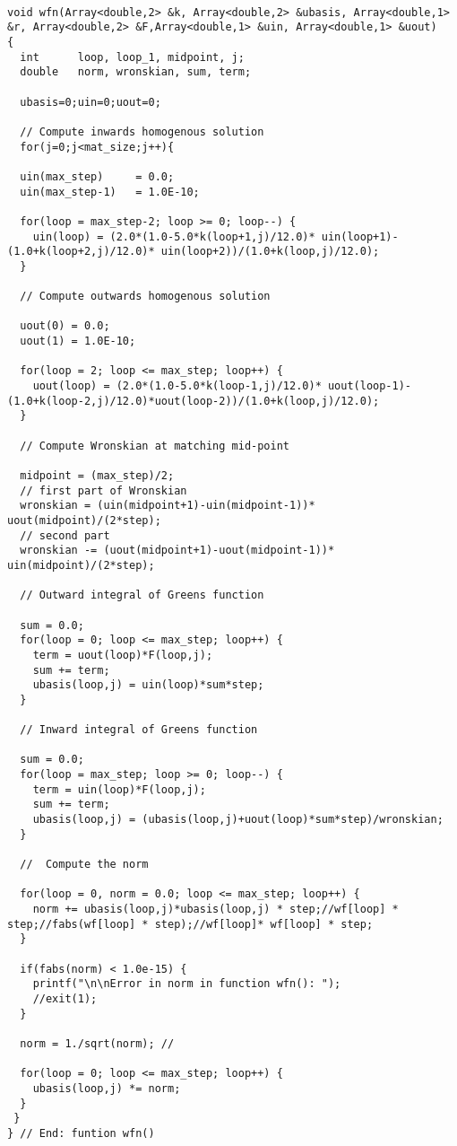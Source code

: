  \begin{lstlisting}

void wfn(Array<double,2> &k, Array<double,2> &ubasis, Array<double,1> &r, Array<double,2> &F,Array<double,1> &uin, Array<double,1> &uout)
{
  int      loop, loop_1, midpoint, j;
  double   norm, wronskian, sum, term;
  
  ubasis=0;uin=0;uout=0;
    
  // Compute inwards homogenous solution
  for(j=0;j<mat_size;j++){
  
  uin(max_step)     = 0.0;
  uin(max_step-1)   = 1.0E-10;

  for(loop = max_step-2; loop >= 0; loop--) {
    uin(loop) = (2.0*(1.0-5.0*k(loop+1,j)/12.0)* uin(loop+1)- (1.0+k(loop+2,j)/12.0)* uin(loop+2))/(1.0+k(loop,j)/12.0);
  }  

  // Compute outwards homogenous solution

  uout(0) = 0.0;
  uout(1) = 1.0E-10;

  for(loop = 2; loop <= max_step; loop++) {
    uout(loop) = (2.0*(1.0-5.0*k(loop-1,j)/12.0)* uout(loop-1)- (1.0+k(loop-2,j)/12.0)*uout(loop-2))/(1.0+k(loop,j)/12.0);
  }  

  // Compute Wronskian at matching mid-point

  midpoint = (max_step)/2;
  // first part of Wronskian
  wronskian = (uin(midpoint+1)-uin(midpoint-1))* uout(midpoint)/(2*step);
  // second part
  wronskian -= (uout(midpoint+1)-uout(midpoint-1))* uin(midpoint)/(2*step);

  // Outward integral of Greens function

  sum = 0.0;
  for(loop = 0; loop <= max_step; loop++) {
    term = uout(loop)*F(loop,j);
    sum += term;
    ubasis(loop,j) = uin(loop)*sum*step;
  }

  // Inward integral of Greens function

  sum = 0.0;
  for(loop = max_step; loop >= 0; loop--) {
    term = uin(loop)*F(loop,j);
    sum += term;
    ubasis(loop,j) = (ubasis(loop,j)+uout(loop)*sum*step)/wronskian;
  }

  //  Compute the norm
   
  for(loop = 0, norm = 0.0; loop <= max_step; loop++) {
    norm += ubasis(loop,j)*ubasis(loop,j) * step;//wf[loop] * step;//fabs(wf[loop] * step);//wf[loop]* wf[loop] * step;
  }
  
  if(fabs(norm) < 1.0e-15) {
    printf("\n\nError in norm in function wfn(): ");
    //exit(1);
  }
  
  norm = 1./sqrt(norm); //
  
  for(loop = 0; loop <= max_step; loop++) {
    ubasis(loop,j) *= norm;
  }
 } 
} // End: funtion wfn() 
 \end{lstlisting}

